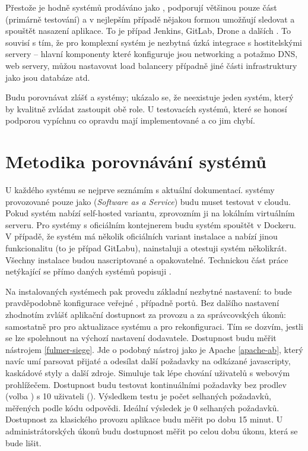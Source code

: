    Přestože je hodně systémů prodáváno jako \CICD, podporují většinou pouze \CI část (primárně testování) a v nejlepším případě nějakou formou umožňují sledovat a spouštět nasazení aplikace. To je případ Jenkins, GitLab, Drone a dalších \cite{ellingwood-cicd-list}. To souvisí s tím, že pro komplexní \CD systém je nezbytná úzká integrace s hostitelskými servery -- hlavní komponenty které \CD konfiguruje jsou networking a potažmo DNS, \HTTP web servery, můžou nastavovat load balancery případně jiné části infrastruktury jako jsou databáze atd.

    Budu porovnávat zlášť \CI a \CD systémy; ukázalo se, že neexistuje jeden systém, který by kvalitně zvládat zastoupit obě role. U testovacích systémů, které se honosí podporou \CD vypíchnu co opravdu mají implementované a co jim chybí.

    \section{Metodika porovnávání \CI systémů}
        U každého systému se nejprve seznámím s aktuální dokumentací. \CI systémy provozované pouze jako  (\textit{Software as a Service}) budu muset testovat v cloudu. Pokud systém nabízí self-hosted variantu, zprovozním ji na lokálním virtuálním serveru. Pro systémy s oficiálním kontejnerem budu systém spouštět v Dockeru. V případě, že systém má několik oficiálních variant instalace a nabízí jinou funkcionalitu (to je případ GitLabu), nainstaluji a otestuji systém několikrát. Všechny instalace budou nascriptované a opakovatelné. Technickou část práce netýkající se přímo daných \CI systémů popisuji .

        Na instalovaných systémech pak provedu základní nezbytné nastavení: to bude pravděpodobně konfigurace veřejné , případně portů.  Bez dalšího nastavení zhodnotím zvlášť aplikační dostupnost za provozu a za správcovských úkonů: samostatně pro pro aktualizace \CI systému a pro rekonfiguraci. Tím se dozvím, jestli se lze spolehnout na výchozí nastavení dodavatele. Dostupnost budu měřit nástrojem  \ref{fulmer-siege}. Jde o podobný nástroj jako je Apache  \ref{apache-ab}, který navíc umí parsovat přijaté  a odesílat další požadavky na odkázané javascripty, kaskádové styly a další zdroje. Simuluje tak lépe chování uživatelů s webovým prohlížečem. Dostupnost budu testovat kontinuálními požadavky bez prodlev (volba ) s 10 uživateli (). Výsledkem testu je počet selhaných požadavků, měřených podle \HTTP kódu odpovědi. Ideální výsledek je 0 selhaných požadavků. Dostupnost za klasického provozu aplikace budu měřit po dobu 15 minut. U administrátorských úkonů budu dostupnost měřit po celou dobu úkonu, která se bude lišit.


